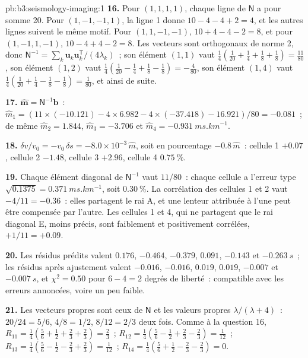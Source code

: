 \begin{solution}{pb:b3:seismology-imaging:1}
\textbf{16.} Pour $(1,1,1,1)$, chaque ligne de $\mathsf N$ a pour somme 20. Pour
$(1,-1,-1,1)$, la ligne 1 donne $10 - 4 - 4 + 2 = 4$, et les autres lignes suivent le même
motif. Pour $(1,1,-1,-1)$, $10 + 4 - 4 - 2 = 8$, et pour $(1,-1,1,-1)$,
$10 - 4 + 4 - 2 = 8$. Les vecteurs sont orthogonaux de norme 2, donc
$\mathsf N^{-1} = \sum_k \mathbf u_k\mathbf u_k^{\mathsf T}/(4\lambda_k)$~; son
élément $(1,1)$ vaut $\tfrac14(\tfrac1{20} + \tfrac14 + \tfrac18 + \tfrac18) =
\tfrac{11}{80}$, son élément $(1,2)$ vaut $\tfrac14(\tfrac1{20} - \tfrac14 + \tfrac18
- \tfrac18) = -\tfrac4{80}$, son élément $(1,4)$ vaut $\tfrac14(\tfrac1{20} +
\tfrac14 - \tfrac18 - \tfrac18) = \tfrac1{80}$, et ainsi de suite.

\textbf{17.} $\hat{\mathbf m} = \mathsf N^{-1}\mathbf b$~:
$\hat m_1 = (11\times(-10.121) - 4\times6.982 - 4\times(-37.418) - 16.921)/80
= -0.081$~; de même $\hat m_2 = 1.844$, $\hat m_3 = -3.706$ et
$\hat m_4 = \qty{-0.931}{ms.km^{-1}}$.

\textbf{18.} $\delta v/v_0 = -v_0\,\delta s = -8.0\times10^{-3}\,\hat m$, soit en
pourcentage $-0.8\,\hat m$~: cellule 1 $+0.07$, cellule 2 $-1.48$, cellule 3 $+2.96$, cellule 4
$\qty{+0.75}{\percent}$.

\textbf{19.} Chaque élément diagonal de $\mathsf N^{-1}$ vaut $11/80$~: chaque cellule a
l'erreur type $\sqrt{0.1375} = \qty{0.371}{ms.km^{-1}}$, soit
$\qty{0.30}{\percent}$. La corrélation des cellules 1 et 2 vaut $-4/11 = -0.36$~:
elles partagent le rai A, et une lenteur attribuée à l'une peut être compensée par l'autre.
Les cellules 1 et 4, qui ne partagent que le rai diagonal E, moins précis, sont faiblement et
positivement corrélées, $+1/11 = +0.09$.

\textbf{20.} Les résidus prédits valent $0.176$, $-0.464$, $-0.379$, $0.091$,
$-0.143$ et $\qty{-0.263}{s}$~; les résidus après ajustement valent $-0.016$,
$-0.016$, $0.019$, $0.019$, $-0.007$ et $\qty{-0.007}{s}$, et
$\chi^2 = 0.50$ pour $6 - 4 = 2$ degrés de liberté~: compatible avec les erreurs
annoncées, voire un peu faible.

\textbf{21.} Les vecteurs propres sont ceux de $\mathsf N$ et les valeurs propres
$\lambda/(\lambda + 4)$~: $20/24 = 5/6$, $4/8 = 1/2$, $8/12 = 2/3$ deux fois. Comme
à la question 16, $R_{11} = \tfrac14(\tfrac56 + \tfrac12 + \tfrac23 + \tfrac23) =
\tfrac23$~; $R_{12} = \tfrac14(\tfrac56 - \tfrac12 + \tfrac23 - \tfrac23) =
\tfrac1{12}$~; $R_{13} = \tfrac14(\tfrac56 - \tfrac12 - \tfrac23 + \tfrac23) =
\tfrac1{12}$~; $R_{14} = \tfrac14(\tfrac56 + \tfrac12 - \tfrac23 - \tfrac23) = 0$.


\end{solution}

